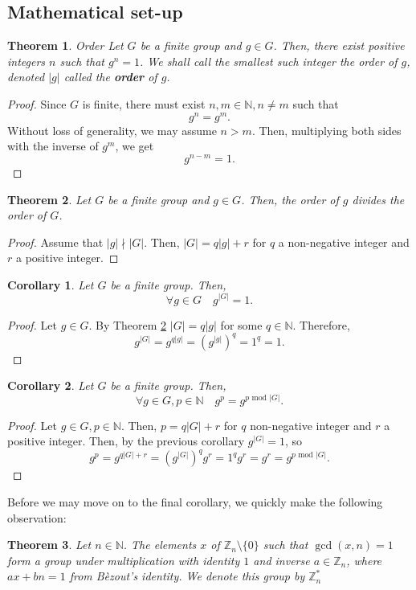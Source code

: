 \documentclass{article}
\newtheorem{theorem}{Theorem}[section]
\newtheorem{corollary}{Corollary}[theorem]
\theoremstyle{definition}
\newcommand{\Int}{\mathbb{Z}}
\newcommand{\Nat}{\mathbb{N}}
\renewcommand{\mod}{\,\,\text{mod}\,\,}
\begin{document}
\subsection{Mathematical set-up}
\begin{theorem}{Order}
  Let $G$ be a finite group and $g \in G$. Then, there exist positive integers
  $n$ such that $g^n = 1$. We shall call the smallest such integer the order of
  $g$, denoted $|g|$ called the \textbf{order} of $g$.
\end{theorem}
\begin{proof}
  Since $G$ is finite, there must exist $n, m \in \Nat, n \neq m$ such that
  \[
    g^n = g^m.
  \]
  Without loss of generality, we may assume $n > m$. Then, multiplying both
  sides with the inverse of $g^m$, we get
  \[
    g^{n - m } = 1.
  \]
\end{proof}
\begin{theorem}
  \label{thm:elemorderdiv}
  Let $G$ be a finite group and $g \in G$. Then, the order of $g$ divides the
  order of $G$.
\end{theorem}
\begin{proof}
  Assume that $|g| \nmid |G|$. Then, $|G| = q|g| + r$ for $q$ a non-negative
  integer and $r$ a positive integer.
\end{proof}
\begin{corollary}
  \label{cor:elemgroupordpow}
  Let $G$ be a finite group. Then,
  \[
    \forall g \in G\quad g^{|G|} = 1.
  \]
\end{corollary}
\begin{proof}
  Let $g \in G$. By Theorem \ref{thm:elemorderdiv} $|G| = q|g|$ for some $q \in
  \Nat$. Therefore,
  \[
    g^{|G|} = g^{q|g|} = (g^{|g|})^q = 1^q = 1.
  \]
\end{proof}
\begin{corollary}
  \label{thm:groupordpow}
  Let $G$ be a finite group. Then,
  \[
    \forall g \in G, p \in \Nat\quad g^p = g^{p \mod |G|}.
  \]
\end{corollary}
\begin{proof}
  \label{thm:grouppowmod}
  Let $g \in G, p \in \Nat$. Then, $p = q|G| + r$ for $q$ non-negative integer
  and $r$ a positive integer. Then, by the previous corollary $g^{|G|} = 1$, so
  \[
    g^p = g^{q|G| + r} = (g^{|G|})^qg^r = 1^qg^r= g^r = g^{p \mod |G|}.
  \]
\end{proof}
Before we may move on to the final corollary, we quickly make the following
observation:
\begin{theorem}
  Let $n \in \Nat$. The elements $x$ of $\Int_n \setminus \{0\}$ such that $\gcd(x, n) = 1$ form
  a group under multiplication with identity $1$ and inverse $a \in \Int_n$,
  where $ax + bn = 1$ from B\`ezout's identity. We denote this group by $\Int^*_n$
\end{theorem}
\end{document}
